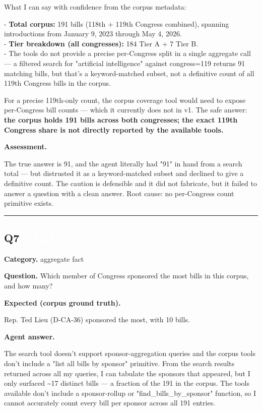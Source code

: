\documentclass[11pt]{article}
\newcommand{\fieldlabel}[1]{\textbf{\color{navy}#1}\quad}
\begin{document}
What I can say with confidence from the corpus metadata:

- \textbf{Total corpus:} 191 bills (118th + 119th Congress combined), spanning introductions from January 9, 2023 through May 4, 2026. \\
- \textbf{Tier breakdown (all congresses):} 184 Tier A + 7 Tier B. \\
- The tools do not provide a precise per-Congress split in a single aggregate call --- a filtered search for "artificial intelligence" against congress=119 returns 91 matching bills, but that's a keyword-matched subset, not a definitive count of all 119th Congress bills in the corpus.

For a precise 119th-only count, the corpus coverage tool would need to expose per-Congress bill counts --- which it currently does not in v1. The safe answer: \textbf{the corpus holds 191 bills across both congresses; the exact 119th Congress share is not directly reported by the available tools.}

\fieldlabel{Assessment.} \colorbox{partialorange}{\textcolor{white}{\bfseries PARTIAL}}\par
The true answer is 91, and the agent literally had "91" in hand from a search total --- but distrusted it as a keyword-matched subset and declined to give a definitive count. The caution is defensible and it did not fabricate, but it failed to answer a question with a clean answer. Root cause: no per-Congress count primitive exists.
\vspace{4pt}\hrule\vspace{8pt}
\subsection*{Q7 \quad \colorbox{partialorange}{\textcolor{white}{\bfseries PARTIAL}}}
\fieldlabel{Category.} aggregate fact\par
\fieldlabel{Question.} Which member of Congress sponsored the most bills in this corpus, and how many?\par
\fieldlabel{Expected (corpus ground truth).}\par
Rep. Ted Lieu (D-CA-36) sponsored the most, with 10 bills.

\fieldlabel{Agent answer.}\par
The search tool doesn't support sponsor-aggregation queries and the corpus tools don't include a "list all bills by sponsor" primitive. From the search results returned across all my queries, I can tabulate the sponsors that appeared, but I only surfaced \textasciitilde{}17 distinct bills --- a fraction of the 191 in the corpus. The tools available don't include a sponsor-rollup or "find\_bills\_by\_sponsor" function, so I cannot accurately count every bill per sponsor across all 191 entries.
\end{document}
